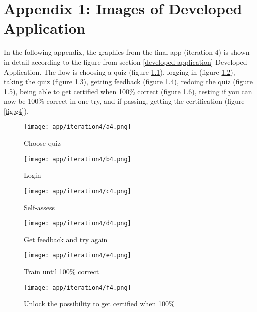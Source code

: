\chapter{Appendix 1: Images of Developed Application}\label{cha:developed-app}

In the following appendix, the graphics from the final app (iteration 4) is shown in detail according to the figure from section \ref{developed-application} Developed Application. The flow is choosing a quiz (figure \ref{fig:a4}), logging in (figure \ref{fig:b4}), taking the quiz (figure \ref{fig:c4}), getting feedback (figure \ref{fig:d4}), redoing the quiz (figure \ref{fig:e4}), being able to get certified when 100\% correct (figure \ref{fig:f4}), testing if you can now be 100\% correct in one try, and if passing, getting the certification (figure \ref{fig:g4}).

\begin{figure}[h]
    \centering
    \texttt{[image: app/iteration4/a4.png]}
    \caption{Choose quiz}
    \label{fig:a4}
\end{figure}

\begin{figure}[h]
    \centering
    \texttt{[image: app/iteration4/b4.png]}
    \caption{Login}
    \label{fig:b4}
\end{figure}

\begin{figure}[h]
    \centering
    \texttt{[image: app/iteration4/c4.png]}
    \caption{Self-assess}
    \label{fig:c4}
\end{figure}

\begin{figure}[h]
    \centering
    \texttt{[image: app/iteration4/d4.png]}
    \caption{Get feedback and try again}
    \label{fig:d4}
\end{figure}

\begin{figure}[h]
    \centering
    \texttt{[image: app/iteration4/e4.png]}
    \caption{Train until 100\% correct}
    \label{fig:e4}
\end{figure}

\begin{figure}[h]
    \centering
    \texttt{[image: app/iteration4/f4.png]}
    \caption{Unlock the possibility to get certified when 100\%}
    \label{fig:f4}
\end{figure}

